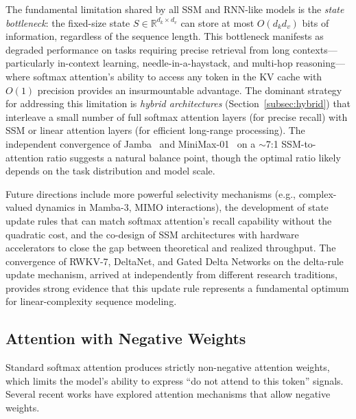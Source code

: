 The fundamental limitation shared by all SSM and RNN-like models is the \emph{state bottleneck}: the fixed-size state $S \in \mathbb{R}^{d_k \times d_v}$ can store at most $O(d_k d_v)$ bits of information, regardless of the sequence length. This bottleneck manifests as degraded performance on tasks requiring precise retrieval from long contexts---particularly in-context learning, needle-in-a-haystack, and multi-hop reasoning---where softmax attention's ability to access any token in the KV cache with $O(1)$ precision provides an insurmountable advantage. The dominant strategy for addressing this limitation is \emph{hybrid architectures} (Section~\ref{subsec:hybrid}) that interleave a small number of full softmax attention layers (for precise recall) with SSM or linear attention layers (for efficient long-range processing). The independent convergence of Jamba~\cite{lieber2024jamba_tr} and MiniMax-01~\cite{minimax2025} on a ${\sim}$7:1 SSM-to-attention ratio suggests a natural balance point, though the optimal ratio likely depends on the task distribution and model scale.

Future directions include more powerful selectivity mechanisms (e.g., complex-valued dynamics in Mamba-3, MIMO interactions), the development of state update rules that can match softmax attention's recall capability without the quadratic cost, and the co-design of SSM architectures with hardware accelerators to close the gap between theoretical and realized throughput. The convergence of RWKV-7, DeltaNet, and Gated Delta Networks on the delta-rule update mechanism, arrived at independently from different research traditions, provides strong evidence that this update rule represents a fundamental optimum for linear-complexity sequence modeling.



\subsection{Attention with Negative Weights}
\label{subsec:neg-attn}

Standard softmax attention produces strictly non-negative attention weights, which limits the model's ability to express ``do not attend to this token'' signals. Several recent works have explored attention mechanisms that allow negative weights.

